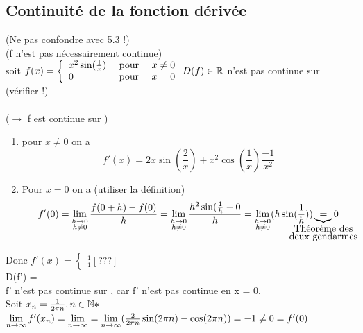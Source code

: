 \documentclass[12pt,a4paper]{article}
\begin{document}
{\subsection{Continuité de la fonction dérivée}
(Ne pas confondre avec 5.3 !)\\
 (f n'est pas nécessairement continue)\\
soit $f(x) = 
\left\{
\begin{array}{lll}
x^2\sin(\frac{1}{x}) & \mbox{ pour } & x \neq 0\\
0 & \mbox{ pour } & x = 0
\end{array}
\right.\\
D(f) \in \mathbb{R}$ n'est pas continue sur \R (vérifier !)\\
\\
 ($\to$ f est continue sur \R)
\begin{enumerate}[label=\roman*.]
	\item pour $x \neq 0$ on a 
		\begin{equation}
			f'(x) = 2x\sin(\frac{2}{x}) + x^2\cos(\frac{1}{x})\frac{-1}{x^2}
		\end{equation}
	\item Pour $x = 0$ on a (utiliser la définition)
		\begin{equation}
			f'(0) = \limite{\substack{h \to 0 \\ h \neq 0}} \frac{f(0+h) - f(0)}{h} = 
			\limite{\substack{h \to 0 \\ h \neq 0}}\frac{h^2\sin(\frac{1}{h}-0}{h} = \limite{\substack{h \to 0 \\ h \neq 0}} (h \sin(\frac{1}{h})) \underbrace{=}_{\mathclap{\substack{\mbox{Théorème des} \\ \mbox{deux gendarmes}}}} 0
		\end{equation}
\end{enumerate}
Donc $f'(x) = 
\left\{
\begin{array}{lll}
\frac{1}{1}[???]
\end{array}
\right.$\\
D(f') = \r\\
f' n'est pas continue sur \R, car f' n'est pas continue en x = 0.\\
 Soit $x_n = \frac{1}{2\pi n}, n \in \mathbb{N}*$\\
$\lim\limits_{n \to \infty} f'(x_n) = \lim\limits_{n \to \infty} = \lim\limits_{n \to \infty}(\frac{2}{2\pi n}\sin(2\pi n)-\cos(2\pi n)) = -1 \neq 0 = f'(0)$\\
}
\end{document}
